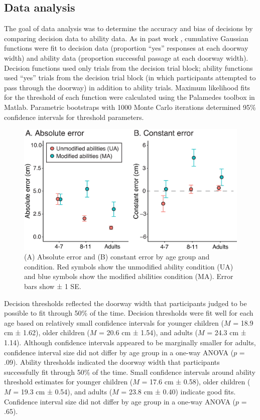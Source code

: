 \documentclass[a4paper,man,natbib,floatsintext,noextraspace]{apa6}
\begin{document}
\subsection{Data analysis}

The goal of data analysis was to determine the accuracy and bias of decisions by comparing decision data to ability data. As in past work \citep{Recal,PregAps}, cumulative Gaussian functions were fit to decision data (proportion “yes” responses at each doorway width) and ability data (proportion successful passage at each doorway width). Decision functions used only trials from the decision trial block; ability functions used “yes” trials from the decision trial block (in which participants attempted to pass through the doorway) in addition to ability trials. Maximum likelihood fits for the threshold of each function were calculated using the Palamedes toolbox \citep{KingdomPrins} in Matlab. Parametric bootstraps with 1000 Monte Carlo iterations determined 95\% confidence intervals for threshold parameters. 

\begin{figure}[htb!]
\centering
\includegraphics[width=1\textwidth]{error.eps}
\caption{\label{fig:curvefit}(A) Absolute error and (B) constant error by age group and condition. Red symbols show the unmodified ability condition (UA) and blue symbols show the modified abilities condition (MA). Error bars show ± 1 SE.}
\end{figure}

Decision thresholds reflected the doorway width that participants judged to be possible to fit through 50\% of the time. Decision thresholds were fit well for each age based on relatively small confidence intervals for younger children ($M$ = 18.9 cm ± 1.62), older children ($M$ = 20.6 cm ± 1.54), and adults ($M$ = 24.3 cm ± 1.14). Although confidence intervals appeared to be marginally smaller for adults, confidence interval size did not differ by age group in a one-way ANOVA ($p$ = .09). Ability thresholds indicated the doorway width that participants successfully fit through 50\% of the time. Small confidence intervals around ability threshold estimates for younger children ($M$ = 17.6 cm ± 0.58), older children ($M$ = 19.3 cm ± 0.54), and adults ($M$ = 23.8 cm ± 0.40) indicate good fits. Confidence interval size did not differ by age group in a one-way ANOVA ($p$ = .65).
\end{document}
